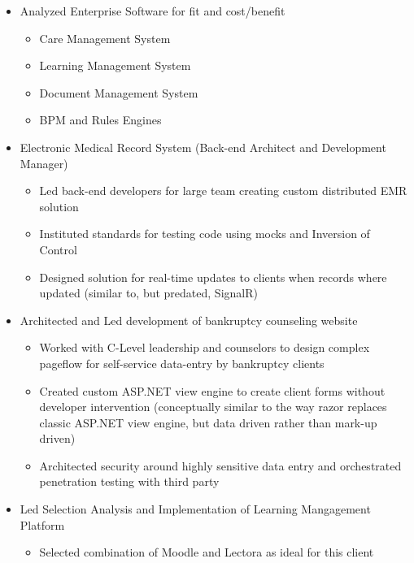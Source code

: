 \documentclass[12pt,letterpaper,sans]{moderncv}
\begin{document}
    \begin{itemize}[leftmargin=1.24in]
        \item Analyzed Enterprise Software for fit and cost/benefit
            \begin{itemize}
                \item Care Management System
                \item Learning Management System
                \item Document Management System
                \item BPM and Rules Engines
            \end{itemize}        
        \item Electronic Medical Record System (Back-end Architect and Development Manager)
            \begin{itemize}
                \item Led back-end developers for large team creating custom distributed EMR solution 
                \item Instituted standards for testing code using mocks and Inversion of Control
                \item Designed solution for real-time updates to clients when records where updated (similar to, but predated, SignalR)
            \end{itemize}
        \item Architected and Led development of bankruptcy counseling website
            \begin{itemize}
                \item Worked with C-Level leadership and counselors to design complex pageflow for self-service data-entry by bankruptcy clients
                \item Created custom ASP.NET view engine to create client forms without developer intervention (conceptually similar to the way razor replaces classic ASP.NET view engine, but data driven rather than mark-up driven)
                \item Architected security around highly sensitive data entry and orchestrated penetration testing with third party
            \end{itemize}
        \item Led Selection Analysis and Implementation of Learning Mangagement Platform
            \begin{itemize}
                \item Selected combination of Moodle and Lectora as ideal for this client

\end{itemize}
\end{itemize}
\end{document}
